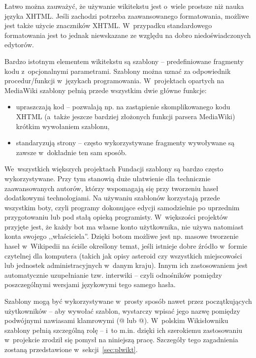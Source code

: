 Łatwo można zauważyć, że używanie wikitekstu jest o~wiele prostsze niż nauka języka XHTML. Jeśli zachodzi potrzeba zaawansowanego formatowania, możliwe jest także użycie znaczników XHTML. W~przypadku standardowego formatowania jest to jednak niewskazane ze względu na dobro niedoświadczonych edytorów.

Bardzo istotnym elementem wikitekstu są szablony -- predefiniowane fragmenty kodu z~opcjonalnymi parametrami. Szablony można uznać za odpowiednik procedur/funkcji w~językach programowania. W~projektach opartych na MediaWiki szablony pełnią przede wszystkim dwie główne funkcje:
\begin{itemize}
	\item upraszczają kod -- pozwalają np. na zastąpienie skomplikowanego kodu XHTML (a~także jeszcze bardziej złożonych funkcji parsera MediaWiki) krótkim wywołaniem szablonu,
	\item standaryzują strony -- często wykorzystywane fragmenty wywoływane są zawsze w~dokładnie ten sam sposób.
\end{itemize}
We~wszystkich większych projektach Fundacji szablony są bardzo często wykorzystywane. Przy tym stanowią duże ułatwienie dla technicznie zaawansowanych autorów, którzy wspomagają się przy tworzeniu haseł dodatkowymi technologiami. Na używaniu szablonów korzystają przede wszystkim boty, czyli programy dokonujące edycji samodzielnie po uprzednim przygotowaniu lub pod stałą opieką programisty. W~większości projektów przyjęte jest, że każdy bot ma własne konto użytkownika, nie używa natomiast konta swojego ,,właściciela''. Dzięki botom możliwe jest np. masowe tworzenie haseł w~Wikipedii na ściśle określony temat, jeśli istnieje dobre źródło w~formie czytelnej dla komputera (takich jak opisy asteroid czy wszystkich miejscowości lub jednostek administracyjnych w~danym kraju). Innym ich zastosowaniem jest automatycznie uzupełnianie tzw. interwiki -- czyli odnośników pomiędzy poszczególnymi wersjami językowymi tego samego hasła.

Szablony mogą być wykorzystywane w~prosty sposób nawet przez początkujących użytkowników -- aby wywołać szablon, wystarczy wpisać jego nazwę
 pomiędzy podwójnymi nawiasami klamrowymi (@ lub @). W~polskim Wikisłowniku szablony pełnią szczególną rolę -- i~to m.in. dzięki ich szerokiemu zastosowaniu w~projekcie zrodził się pomysł na niniejszą pracę. Szczegóły tego zagadnienia zostaną przedstawione w~sekcji~\ref{sec:plwikt}.

